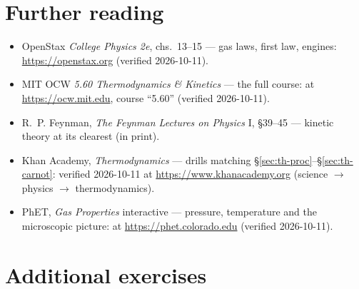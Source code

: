 \section*{Further reading}

\begin{itemize}
\item OpenStax \emph{College Physics 2e}, chs.~13--15 --- gas laws,
first law, engines: \url{https://openstax.org} (verified 2026-10-11).
\item MIT OCW \emph{5.60 Thermodynamics \& Kinetics} --- the full
course: at \url{https://ocw.mit.edu}, course ``5.60'' (verified
2026-10-11).
\item R.~P. Feynman, \emph{The Feynman Lectures on Physics} I,
\S39--45 --- kinetic theory at its clearest (in print).
\item Khan Academy, \emph{Thermodynamics} --- drills matching
\S\ref{sec:th-proc}--\S\ref{sec:th-carnot}: verified 2026-10-11 at
\url{https://www.khanacademy.org} (science $\to$ physics $\to$
thermodynamics).
\item PhET, \emph{Gas Properties} interactive --- pressure, temperature
and the microscopic picture: at \url{https://phet.colorado.edu}
(verified 2026-10-11).
\end{itemize}

\section*{Additional exercises}

